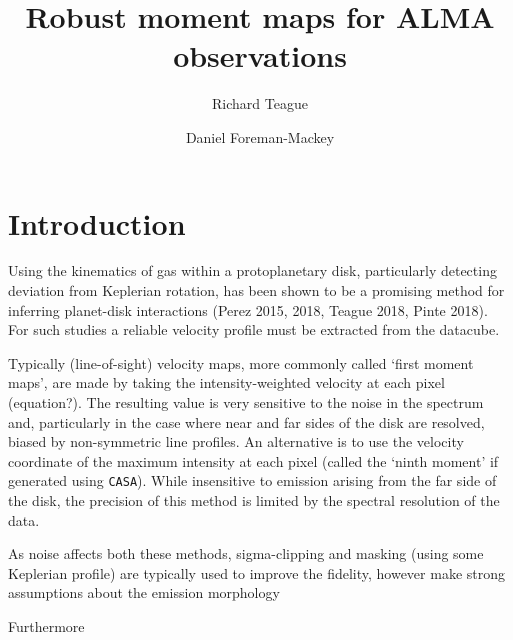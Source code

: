 \documentclass[rnaas]{aastex62}
\begin{document}
\raggedbottom\sloppy\sloppypar\frenchspacing

\title{%
Robust moment maps for ALMA observations
}

\author[0000-0003-1534-5186]{Richard Teague}

\author[0000-0002-9328-5652]{Daniel Foreman-Mackey}


\section{Introduction}


Using the kinematics of gas within a protoplanetary disk, particularly detecting deviation from Keplerian rotation, has been shown to be a promising method for inferring planet-disk interactions (Perez 2015, 2018, Teague 2018, Pinte 2018). For such studies a reliable velocity profile must be extracted from the datacube.

Typically (line-of-sight) velocity maps, more commonly called `first moment maps', are made by taking the intensity-weighted velocity at each pixel (equation?). The resulting value is very sensitive to the noise in the spectrum and, particularly in the case where near and far sides of the disk are resolved, biased by non-symmetric line profiles. An alternative is to use the velocity coordinate of the maximum intensity at each pixel (called the `ninth moment' if generated using \texttt{CASA}). While insensitive to emission arising from the far side of the disk, the precision of this method is limited by the spectral resolution of the data.

As noise affects both these methods, sigma-clipping and masking (using some Keplerian profile) are typically used to improve the fidelity, however make strong assumptions about the emission morphology

Furthermore
\end{document}

